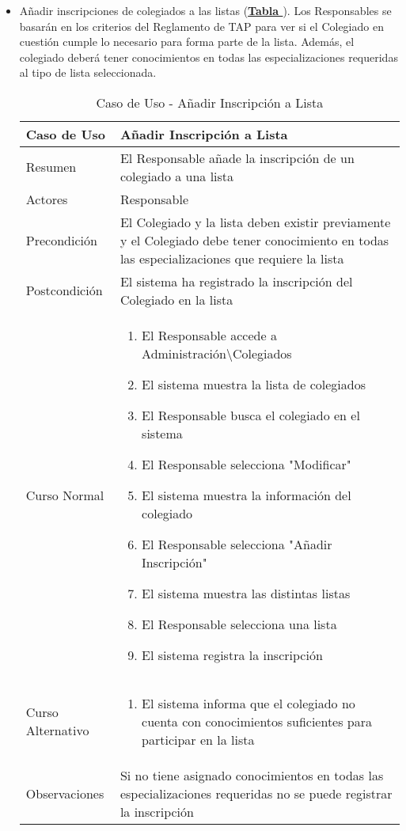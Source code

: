\begin{itemize}
	\item \addtocounter{tabla}{1} Añadir inscripciones de colegiados a las listas (\textbf{\hyperref[tab:curCrearInscrLst]{Tabla }}). Los Responsables se basarán en los criterios del Reglamento de TAP\cite{reglamentotapcpiia} para ver si el Colegiado en cuestión cumple lo necesario para forma parte de la lista. Además, el colegiado deberá tener conocimientos en todas las especializaciones requeridas al tipo de lista seleccionada.
		\begin{table}[!htbp]
		  \centering  \addtocounter{casouso}{1}
		  \begin{tabular}{|l | p{100mm}|}
		    \textbf{Caso de Uso}  & \textbf{Añadir Inscripción a Lista} \\ \hline
		    Resumen 		 & El Responsable añade la inscripción de un colegiado a una lista \\ \hline
		    Actores  		 & Responsable \\ \hline
		    Precondición  	 & El Colegiado y la lista deben existir previamente y el Colegiado debe tener conocimiento en todas las especializaciones que requiere la lista  \\ \hline
		    Postcondición  	 & El sistema ha registrado la inscripción del Colegiado en la lista \\ \hline
		    Curso Normal   	 & \begin{enumerate}
			  \item El Responsable accede a Administración\textbackslash Colegiados
			  \item El sistema muestra la lista de colegiados
			  \item El Responsable busca el colegiado en el sistema
			  \item El Responsable selecciona "Modificar"
			  \item El sistema muestra la información del colegiado
			  \item El Responsable selecciona "Añadir Inscripción"
			  \item El sistema muestra las distintas listas
			  \item El Responsable selecciona una lista
			  \item El sistema registra la inscripción
		    \end{enumerate}  \\ \hline
		    Curso Alternativo  & \begin{enumerate}
			  \item El sistema informa que el colegiado no cuenta con conocimientos suficientes para participar en la lista
		    \end{enumerate}  \\ \hline
		    Observaciones 	 & Si no tiene asignado conocimientos en todas las especializaciones requeridas no se puede registrar la inscripción \\ \hline
		  \end{tabular}
		  \caption{Caso de Uso  - Añadir Inscripción a Lista}
		  \label{tab:curCrearInscrLst}
		\end{table}
		\FloatBarrier
		

\end{itemize}
